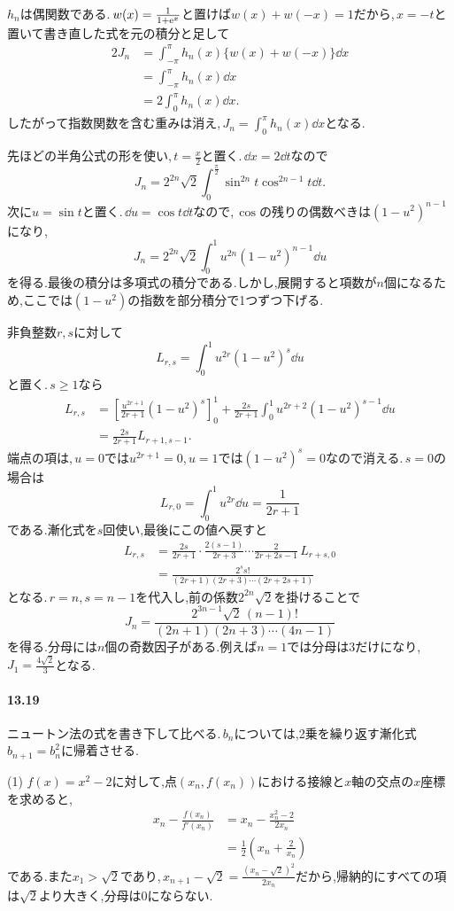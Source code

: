 $h_n$は偶関数である.\,$w(x)=\frac1{1+\mathrm{e}^x}$と置けば$w(x)+w(-x)=1$だから,\,$x=-t$と置いて書き直した式を元の積分と足して
\[
 \begin{aligned}
 2J_n
 &=\int_{-\pi}^{\pi}h_n(x)\{w(x)+w(-x)\}\dd x\\
 &=\int_{-\pi}^{\pi}h_n(x)\dd x\\
 &=2\int_0^\pi h_n(x)\dd x.
 \end{aligned}
\]
したがって指数関数を含む重みは消え,\,$J_n=\int_0^\pi h_n(x)\dd x$となる.

先ほどの半角公式の形を使い,\,$t=\frac x2$と置く.\,$\dd x=2\dd t$なので
\[
 J_n=2^{2n}\sqrt2\int_0^{\frac\pi2}
          \sin^{2n}t\cos^{2n-1}t\dd t.
\]
次に$u=\sin t$と置く.\,$\dd u=\cos t\dd t$なので,\,$\cos$の残りの偶数べきは$(1-u^2)^{n-1}$になり,
\[
 J_n=2^{2n}\sqrt2\int_0^1u^{2n}(1-u^2)^{n-1}\dd u
\]
を得る.最後の積分は多項式の積分である.しかし,展開すると項数が$n$個になるため,ここでは$(1-u^2)$の指数を部分積分で1つずつ下げる.

非負整数$r,s$に対して
\[
 L_{r,s}=\int_0^1u^{2r}(1-u^2)^s\dd u
\]
と置く.\,$s\ge1$なら
\[
 \begin{aligned}
 L_{r,s}
 &=\left[\frac{u^{2r+1}}{2r+1}(1-u^2)^s\right]_0^1
   +\frac{2s}{2r+1}\int_0^1u^{2r+2}(1-u^2)^{s-1}\dd u\\
 &=\frac{2s}{2r+1}L_{r+1,s-1}.
 \end{aligned}
\]
端点の項は,\,$u=0$では$u^{2r+1}=0$,\,$u=1$では$(1-u^2)^s=0$なので消える.\,$s=0$の場合は
\[
 L_{r,0}=\int_0^1u^{2r}\dd u=\frac1{2r+1}
\]
である.漸化式を$s$回使い,最後にこの値へ戻すと
\[
 \begin{aligned}
 L_{r,s}
 &=\frac{2s}{2r+1}\cdot\frac{2(s-1)}{2r+3}\cdots\frac{2}{2r+2s-1}\,L_{r+s,0}\\
 &=\frac{2^s s!}{(2r+1)(2r+3)\cdots(2r+2s+1)}
 \end{aligned}
\]
となる.\,$r=n$,\,$s=n-1$を代入し,前の係数$2^{2n}\sqrt2$を掛けることで
\[
 \boxed{J_n=
 \frac{2^{3n-1}\sqrt2\,(n-1)!}
 {(2n+1)(2n+3)\cdots(4n-1)}}
\]
を得る.分母には$n$個の奇数因子がある.例えば$n=1$では分母は$3$だけになり,\,$J_1=\frac{4\sqrt2}{3}$となる.

\paragraph{13.19}
ニュートン法の式を書き下して比べる.\,$b_n$については,2乗を繰り返す漸化式$b_{n+1}=b_n^2$に帰着させる.

(1) $f(x)=x^2-2$に対して,点$(x_n,f(x_n))$における接線と$x$軸の交点の$x$座標を求めると,
\[
 \begin{aligned}
 x_n-\frac{f(x_n)}{f'(x_n)}
 &=x_n-\frac{x_n^2-2}{2x_n}\\
 &=\frac12\left(x_n+\frac2{x_n}\right)
 \end{aligned}
\]
である.また$x_1>\sqrt2$であり,\,$x_{n+1}-\sqrt2=\frac{(x_n-\sqrt2)^2}{2x_n}$だから,帰納的にすべての項は$\sqrt2$より大きく,分母は$0$にならない.

